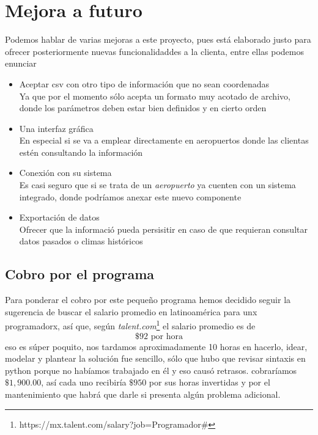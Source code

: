 \documentclass[letterpaper]{article}
\begin{document}
\section{Mejora a futuro}
Podemos hablar de varias mejoras a este proyecto, pues está elaborado justo para ofrecer posteriormente nuevas funcionalidaddes a la clienta, entre ellas podemos enunciar
\begin{itemize}
	\item Aceptar csv con otro tipo de información que no sean coordenadas\\
	Ya que por el momento sólo acepta un formato muy acotado de archivo, donde los parámetros deben estar bien definidos y en cierto orden
	\item Una interfaz gráfica \\
	En especial si se va a emplear directamente en aeropuertos donde las clientas estén consultando la información
	\item Conexión con su sistema\\
	Es casi seguro que si se trata de un \textit{aeropuerto} ya cuenten con un sistema integrado, donde podríamos anexar este nuevo componente
	\item Exportación de datos\\
	Ofrecer que la informació pueda persisitir en caso de que requieran consultar datos pasados o climas históricos
\end{itemize}
\subsection{Cobro por el programa}
Para ponderar el cobro por este pequeño programa hemos decidido seguir la sugerencia de buscar el salario promedio en latinoamérica para unx programadorx, así que, según \textit{talent.com}\footnote{https://mx.talent.com/salary?job=Programador\#} el salario promedio es de 
\[  \$ 92 \text{  por hora} \] 
eso es súper poquito, nos tardamos aproximadamente 10 horas en hacerlo, idear, modelar y plantear la solución fue sencillo, sólo que hubo que revisar sintaxis en python porque no habíamos trabajado en él y eso causó retrasos.
cobraríamos $ \$1,900.00 $, así cada uno recibiría $ \$ 950 $ por sus horas invertidas y por el mantenimiento que habrá que darle si presenta algún problema adicional.
\end{document}
